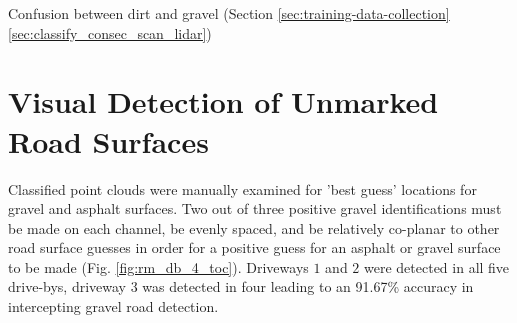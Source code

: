 \documentclass[numbered,pdftex]{ohio-etd}
\begin{document}
{{{		%
		
%	
		{Confusion between dirt and gravel (Section \ref{sec:training-data-collection} \ref{sec:classify_consec_scan_lidar}) }
	
	
	}
	
	
	\section{Visual Detection of Unmarked Road Surfaces}{
	
		
		{Classified point clouds were manually examined for 'best guess' locations for gravel and asphalt surfaces. Two out of three positive gravel identifications must be made on each channel, be evenly spaced, and be relatively co-planar to other road surface guesses in order for a positive guess for an asphalt or gravel surface to be made (Fig. \ref{fig:rm_db_4_toc}). Driveways $1$ and $2$ were detected in all five drive-bys, driveway $3$ was detected in four leading to an 91.67\% accuracy in intercepting gravel road detection.}
		
		
		
		
	
	}



}}
\end{document}
